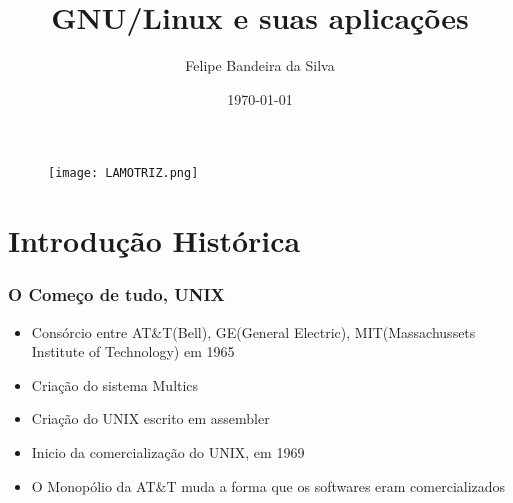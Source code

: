\documentclass{beamer}
\title[GNU/Linux]{GNU/Linux e suas aplicações} %
\author{Felipe Bandeira da Silva} %
\institute[Unifor] %
{
Universidade de Fortaleza-UNIFOR\\Universidade de Federal do Ceará-UFC\\ %
\medskip
\textit{felipeband18@gmail.com} %
}
\date{\today} %
\begin{document}
\begin{frame}
    \begin{figure}
        \texttt{[image: LAMOTRIZ.png]}
    \end{figure}
\titlepage %
\end{frame}



\section{Introdução Histórica} %

\begin{frame}
    \frametitle{O Começo de tudo, UNIX}

    \begin{itemize}
        \item Consórcio entre AT\&T(Bell), GE(General Electric), MIT(Massachussets Institute of Technology) em 1965
        \item Criação do sistema Multics
        \item Criação do UNIX escrito em assembler
        \item Inicio da comercialização do UNIX, em 1969
        \item O Monopólio da AT\&T muda a forma que os softwares eram comercializados
    \end{itemize}
\end{frame}
\end{document}
